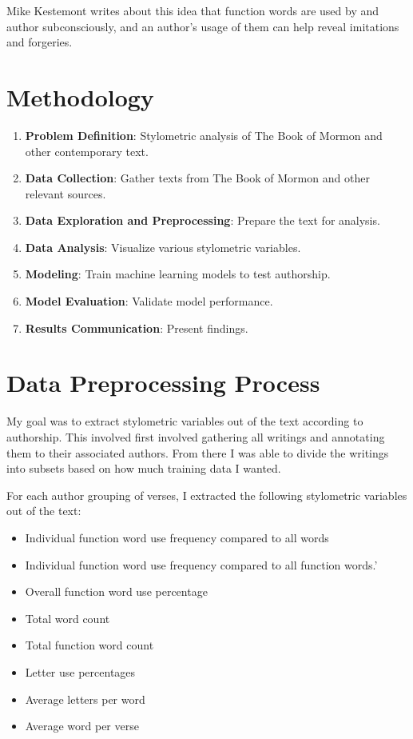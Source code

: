 \documentclass[
  letterpaper,
  DIV=11,
  numbers=noendperiod]{scrartcl}
\providecommand{\tightlist}{%
  \setlength{\itemsep}{0pt}\setlength{\parskip}{0pt}}\usepackage{longtable,booktabs,array}
\begin{document}
Mike Kestemont writes about this idea that function words are used by
and author subconsciously, and an author's usage of them can help reveal
imitations and forgeries.

\hypertarget{methodology}{%
\section{Methodology}\label{methodology}}

\begin{enumerate}
\def\labelenumi{\arabic{enumi}.}
\tightlist
\item
  \textbf{Problem Definition}: Stylometric analysis of The Book of
  Mormon and other contemporary text.
\item
  \textbf{Data Collection}: Gather texts from The Book of Mormon and
  other relevant sources.
\item
  \textbf{Data Exploration and Preprocessing}: Prepare the text for
  analysis.
\item
  \textbf{Data Analysis}: Visualize various stylometric variables.
\item
  \textbf{Modeling}: Train machine learning models to test authorship.
\item
  \textbf{Model Evaluation}: Validate model performance.
\item
  \textbf{Results Communication}: Present findings.
\end{enumerate}

\hypertarget{data-preprocessing-process}{%
\section{Data Preprocessing Process}\label{data-preprocessing-process}}

My goal was to extract stylometric variables out of the text according
to authorship. This involved first involved gathering all writings and
annotating them to their associated authors. From there I was able to
divide the writings into subsets based on how much training data I
wanted.

For each author grouping of verses, I extracted the following
stylometric variables out of the text:

\begin{itemize}
\tightlist
\item
  Individual function word use frequency compared to all words
\item
  Individual function word use frequency compared to all function
  words.'
\item
  Overall function word use percentage
\item
  Total word count
\item
  Total function word count
\item
  Letter use percentages
\item
  Average letters per word
\item
  Average word per verse
\end{itemize}
\end{document}
